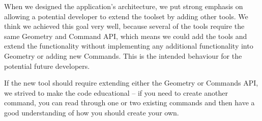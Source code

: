 When we designed the application's architecture, we put strong emphasis on allowing a potential developer to extend the toolset by adding other tools. We think we achieved this goal very well, because several of the tools require the same Geometry and Command API, which means we could add the tools and extend the functionality without implementing any additional functionality into Geometry or adding new Commands. This is the intended behaviour for the potential future developers.

If the new tool should require extending either the Geometry or Commands API, we strived to make the code educational -- if you need to create another command, you can read through one or two existing commands and then have a good understanding of how you should create your own.